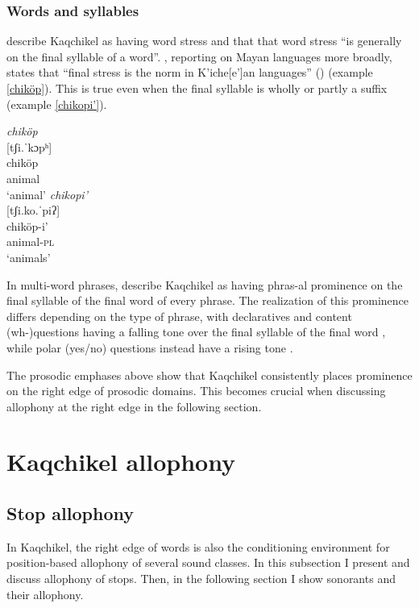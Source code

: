 \documentclass[output=paper,colorlinks,citecolor=brown]{langscibook}
\begin{document}
\subsubsection{Words and syllables}\label{Words and syllables}
\citet[138]{brown_maxwell_little_2006} describe Kaqchikel as having word stress and that that word stress “is generally on the final syllable of a word”. \citet{Bennett:2016}, reporting on Mayan languages more broadly, states that “final stress is the norm in K’iche[e’]an languages” (\citeyear[495]{Bennett:2016}) (example \ref{chiköp}). This is true even when the final syllable is wholly or partly a suffix (example \ref{chikopi’}).
\begin{multicols}{2}

\ea
    \ea\label{chiköp}
    \gllll \emph{chiköp}    \\
    {}[tʃi.ˈkɔpʰ]   \\
    chiköp  \\
    animal \\
    \glt ‘animal’  
\columnbreak
    \ex\label{chikopi’}
    \gllll \emph{chikopi’} \\
    {}[tʃi.ko.ˈpiʔ]    \\
    chiköp-i’ \\
    animal-\textsc{pl} \\
    \glt ‘animals’ 
    \z
\z

\end{multicols}

In multi-word phrases, \citet{brown_maxwell_little_2006} describe Kaqchikel as having phras-al prominence on the final syllable of the final word of every phrase. The realization of this prominence differs depending on the type of phrase, with declaratives and content (wh-)questions having a falling tone over the final syllable of the final word \citep{nelson_2020}, while polar (yes/no) questions instead have a rising tone \citep{brown_maxwell_little_2006}.

The prosodic emphases above show that Kaqchikel consistently places prominence on the right edge of prosodic domains. This becomes crucial when discussing allophony at the right edge in the following section.

\section{Kaqchikel allophony}\label{Kaqchikel allophony}
\largerpage
\subsection{Stop allophony}\label{Stop allophony}
In Kaqchikel, the right edge of words is also the conditioning environment for position-based allophony of several sound classes. In this subsection I present and discuss allophony of stops. Then, in the following section I show sonorants and their allophony.
\end{document}
